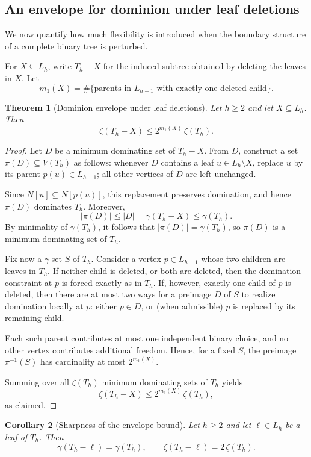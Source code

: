 \documentclass[11pt]{article}
\newtheorem{theorem}{Theorem}
\newtheorem{corollary}[theorem]{Corollary}
\theoremstyle{definition}
\theoremstyle{remark}
\begin{document}
\subsection{An envelope for dominion under leaf deletions}
We now quantify how much flexibility is introduced when the boundary structure
of a complete binary tree is perturbed.

For $X\subseteq L_h$, write $T_h-X$ for the induced subtree obtained by deleting
the leaves in $X$.
Let
\[
m_1(X)=\#\{\text{parents in }L_{h-1}\text{ with exactly one deleted child}\}.
\]

\begin{theorem}[Dominion envelope under leaf deletions]\label{thm:envelope}
Let $h\ge 2$ and let $X\subseteq L_h$. Then
\[
\zeta(T_h-X)\le 2^{m_1(X)}\,\zeta(T_h).
\]
\end{theorem}

\begin{proof}
Let $D$ be a minimum dominating set of $T_h-X$.
From $D$, construct a set $\pi(D)\subseteq V(T_h)$ as follows:
whenever $D$ contains a leaf $u\in L_h\setminus X$, replace $u$ by its parent
$p(u)\in L_{h-1}$; all other vertices of $D$ are left unchanged.

Since $N[u]\subseteq N[p(u)]$, this replacement preserves domination,
and hence $\pi(D)$ dominates $T_h$.
Moreover,
\[
|\pi(D)|\le |D|=\gamma(T_h-X)\le \gamma(T_h).
\]
By minimality of $\gamma(T_h)$, it follows that $|\pi(D)|=\gamma(T_h)$,
so $\pi(D)$ is a minimum dominating set of $T_h$.

Fix now a $\gamma$-set $S$ of $T_h$.
Consider a vertex $p\in L_{h-1}$ whose two children are leaves in $T_h$.
If neither child is deleted, or both are deleted, then the domination constraint
at $p$ is forced exactly as in $T_h$.
If, however, exactly one child of $p$ is deleted, then there are at most two
ways for a preimage $D$ of $S$ to realize domination locally at $p$:
either $p\in D$, or (when admissible) $p$ is replaced by its remaining child.

Each such parent contributes at most one independent binary choice, and no
other vertex contributes additional freedom.
Hence, for a fixed $S$, the preimage $\pi^{-1}(S)$ has cardinality at most
$2^{m_1(X)}$.

Summing over all $\zeta(T_h)$ minimum dominating sets of $T_h$ yields
\[
\zeta(T_h-X)\le 2^{m_1(X)}\,\zeta(T_h),
\]
as claimed.
\end{proof}

\begin{corollary}[Sharpness of the envelope bound]\label{cor:single-leaf}
Let $h\ge 2$ and let $\ell\in L_h$ be a leaf of $T_h$. Then
\[
\gamma(T_h-\ell)=\gamma(T_h),
\qquad
\zeta(T_h-\ell)=2\,\zeta(T_h).
\]
\end{corollary}
\end{document}

